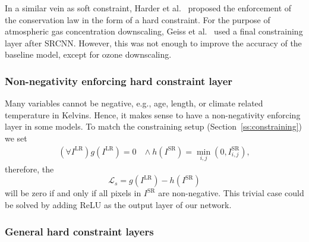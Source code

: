 In a similar vein as soft constraint, Harder et al.~\cite{Harder2023} proposed the enforcement of the conservation law in the form of a hard constraint.
For the purpose of atmospheric gas concentration downscaling, Geiss et al.~\cite{Geiss2022} used a final constraining layer after SRCNN. 
However, this was not enough to improve the accuracy of the baseline model, except for ozone downscaling. 

\subsubsection{Non-negativity enforcing hard constraint layer}

Many variables cannot be negative, e.g., age, length, or climate related temperature in Kelvins.
Hence, it makes sense to have a non-negativity enforcing layer in some models.
To match the constraining setup (Section~\ref{ss:constraining}) we set 
\begin{equation}
\begin{aligned}
    \left(\forall I^{\text{LR}} \right) g\left(I^{\text{LR}}\right) = 0
    \ &\wedge \ 
h\left(I^{\text{SR}}\right) = \min_{i,j}\left(0, I^\text{SR}_{i,j}\right),
\end{aligned}
\end{equation}
therefore, the 
\begin{equation}
\mathcal{L}_s = g\left(I^{\text{LR}}\right) - h\left(I^{\text{SR}}\right)    
\end{equation}
will be zero if and only if all pixels in $I^\text{SR}$ are non-negative.
This trivial case could be solved by adding ReLU as the output layer of our network.

\subsubsection{General hard constraint layers}

